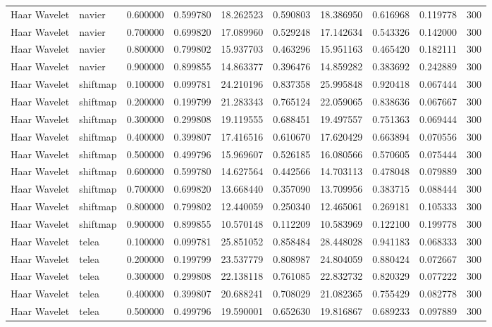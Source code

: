 \begin{table}[h]
\begin{tabular}{llrrrrrrrr}
Haar Wavelet & navier & 0.600000 & 0.599780 & 18.262523 & 0.590803 & 18.386950 & 0.616968 & 0.119778 & 300 \\
Haar Wavelet & navier & 0.700000 & 0.699820 & 17.089960 & 0.529248 & 17.142634 & 0.543326 & 0.142000 & 300 \\
Haar Wavelet & navier & 0.800000 & 0.799802 & 15.937703 & 0.463296 & 15.951163 & 0.465420 & 0.182111 & 300 \\
Haar Wavelet & navier & 0.900000 & 0.899855 & 14.863377 & 0.396476 & 14.859282 & 0.383692 & 0.242889 & 300 \\
Haar Wavelet & shiftmap & 0.100000 & 0.099781 & 24.210196 & 0.837358 & 25.995848 & 0.920418 & 0.067444 & 300 \\
Haar Wavelet & shiftmap & 0.200000 & 0.199799 & 21.283343 & 0.765124 & 22.059065 & 0.838636 & 0.067667 & 300 \\
Haar Wavelet & shiftmap & 0.300000 & 0.299808 & 19.119555 & 0.688451 & 19.497557 & 0.751363 & 0.069444 & 300 \\
Haar Wavelet & shiftmap & 0.400000 & 0.399807 & 17.416516 & 0.610670 & 17.620429 & 0.663894 & 0.070556 & 300 \\
Haar Wavelet & shiftmap & 0.500000 & 0.499796 & 15.969607 & 0.526185 & 16.080566 & 0.570605 & 0.075444 & 300 \\
Haar Wavelet & shiftmap & 0.600000 & 0.599780 & 14.627564 & 0.442566 & 14.703113 & 0.478048 & 0.079889 & 300 \\
Haar Wavelet & shiftmap & 0.700000 & 0.699820 & 13.668440 & 0.357090 & 13.709956 & 0.383715 & 0.088444 & 300 \\
Haar Wavelet & shiftmap & 0.800000 & 0.799802 & 12.440059 & 0.250340 & 12.465061 & 0.269181 & 0.105333 & 300 \\
Haar Wavelet & shiftmap & 0.900000 & 0.899855 & 10.570148 & 0.112209 & 10.583969 & 0.122100 & 0.199778 & 300 \\
Haar Wavelet & telea & 0.100000 & 0.099781 & 25.851052 & 0.858484 & 28.448028 & 0.941183 & 0.068333 & 300 \\
Haar Wavelet & telea & 0.200000 & 0.199799 & 23.537779 & 0.808987 & 24.804059 & 0.880424 & 0.072667 & 300 \\
Haar Wavelet & telea & 0.300000 & 0.299808 & 22.138118 & 0.761085 & 22.832732 & 0.820329 & 0.077222 & 300 \\
Haar Wavelet & telea & 0.400000 & 0.399807 & 20.688241 & 0.708029 & 21.082365 & 0.755429 & 0.082778 & 300 \\
Haar Wavelet & telea & 0.500000 & 0.499796 & 19.590001 & 0.652630 & 19.816867 & 0.689233 & 0.097889 & 300 \\

\end{tabular}
\end{table}
